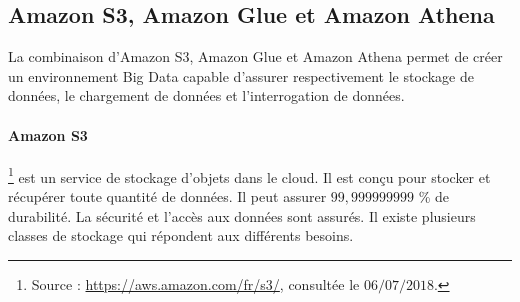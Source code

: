\subsection{Amazon S3, Amazon Glue et Amazon Athena }

La combinaison d'Amazon S3, Amazon Glue et Amazon Athena permet de créer un environnement Big Data capable d'assurer respectivement le stockage de données, le chargement de données  et l'interrogation de données. 


\paragraph{Amazon S3}
\footnote{Source : \url{https://aws.amazon.com/fr/s3/}, consultée le $06/07/2018$.} est un service de stockage d'objets dans le cloud. Il est conçu pour stocker et  récupérer toute quantité de données. Il peut assurer $ 99,999999999 $ \% de durabilité. La sécurité  et l'accès aux données sont assurés. Il existe plusieurs classes de stockage qui répondent aux différents besoins. 

